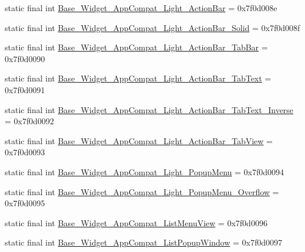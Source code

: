 \begin{DoxyCompactItemize}
static final int \mbox{\hyperlink{classandroid_1_1support_1_1v7_1_1appcompat_1_1R_1_1style_a312f41634ed7c5c1ed7363e934bbd4df}{Base\+\_\+\+Widget\+\_\+\+App\+Compat\+\_\+\+Light\+\_\+\+Action\+Bar}} = 0x7f0d008e
\item 
static final int \mbox{\hyperlink{classandroid_1_1support_1_1v7_1_1appcompat_1_1R_1_1style_afe2f5b048e0567f29091d3f83d5fbf04}{Base\+\_\+\+Widget\+\_\+\+App\+Compat\+\_\+\+Light\+\_\+\+Action\+Bar\+\_\+\+Solid}} = 0x7f0d008f
\item 
static final int \mbox{\hyperlink{classandroid_1_1support_1_1v7_1_1appcompat_1_1R_1_1style_a8d592bd0919bb0c93d0dfdcdf87b9364}{Base\+\_\+\+Widget\+\_\+\+App\+Compat\+\_\+\+Light\+\_\+\+Action\+Bar\+\_\+\+Tab\+Bar}} = 0x7f0d0090
\item 
static final int \mbox{\hyperlink{classandroid_1_1support_1_1v7_1_1appcompat_1_1R_1_1style_aafd59f0c3cf68cf0449532c814c75409}{Base\+\_\+\+Widget\+\_\+\+App\+Compat\+\_\+\+Light\+\_\+\+Action\+Bar\+\_\+\+Tab\+Text}} = 0x7f0d0091
\item 
static final int \mbox{\hyperlink{classandroid_1_1support_1_1v7_1_1appcompat_1_1R_1_1style_ae38a524df3514da4bd318b3c6d375194}{Base\+\_\+\+Widget\+\_\+\+App\+Compat\+\_\+\+Light\+\_\+\+Action\+Bar\+\_\+\+Tab\+Text\+\_\+\+Inverse}} = 0x7f0d0092
\item 
static final int \mbox{\hyperlink{classandroid_1_1support_1_1v7_1_1appcompat_1_1R_1_1style_aac1ceb67855c4caadba59914e549affe}{Base\+\_\+\+Widget\+\_\+\+App\+Compat\+\_\+\+Light\+\_\+\+Action\+Bar\+\_\+\+Tab\+View}} = 0x7f0d0093
\item 
static final int \mbox{\hyperlink{classandroid_1_1support_1_1v7_1_1appcompat_1_1R_1_1style_a50f811d977ea50bc76491f4c9261b8c0}{Base\+\_\+\+Widget\+\_\+\+App\+Compat\+\_\+\+Light\+\_\+\+Popup\+Menu}} = 0x7f0d0094
\item 
static final int \mbox{\hyperlink{classandroid_1_1support_1_1v7_1_1appcompat_1_1R_1_1style_a3de145bd9f6d8e62d338bf486619da5b}{Base\+\_\+\+Widget\+\_\+\+App\+Compat\+\_\+\+Light\+\_\+\+Popup\+Menu\+\_\+\+Overflow}} = 0x7f0d0095
\item 
static final int \mbox{\hyperlink{classandroid_1_1support_1_1v7_1_1appcompat_1_1R_1_1style_afbcc6cc370144b7990614ee39bd36197}{Base\+\_\+\+Widget\+\_\+\+App\+Compat\+\_\+\+List\+Menu\+View}} = 0x7f0d0096
\item 
static final int \mbox{\hyperlink{classandroid_1_1support_1_1v7_1_1appcompat_1_1R_1_1style_a5a8c0b50418d32051e5f61365c8b8951}{Base\+\_\+\+Widget\+\_\+\+App\+Compat\+\_\+\+List\+Popup\+Window}} = 0x7f0d0097

\end{DoxyCompactItemize}

